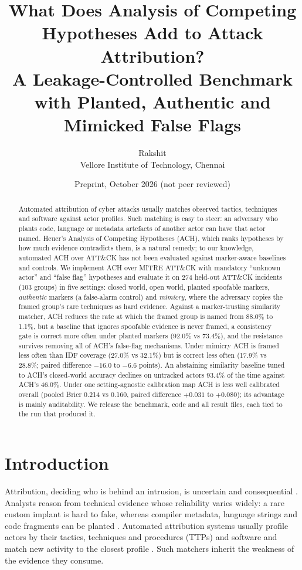 \documentclass[11pt]{article}
\title{What Does Analysis of Competing Hypotheses Add to Attack Attribution?\\
\large A Leakage-Controlled Benchmark with Planted, Authentic and Mimicked False Flags}
\author{Rakshit\\Vellore Institute of Technology, Chennai}
\date{Preprint, October 2026 (not peer reviewed)}
\begin{document}
\maketitle

\begin{abstract}
Automated attribution of cyber attacks usually matches observed tactics,
techniques and software against actor profiles. Such matching is easy to
steer: an adversary who plants code, language or metadata artefacts of
another actor can have that actor named. Heuer's Analysis of Competing
Hypotheses (ACH), which ranks hypotheses by how much evidence contradicts
them, is a natural remedy; to our knowledge, automated ACH over ATT\&CK has
not been evaluated against marker-aware baselines and controls. We implement
ACH over MITRE ATT\&CK with mandatory ``unknown actor'' and ``false flag''
hypotheses and evaluate it on 274 held-out ATT\&CK incidents (103 groups) in
five settings: closed world, open world, planted spoofable markers,
\emph{authentic} markers (a false-alarm control) and \emph{mimicry}, where the
adversary copies the framed group's rare techniques as hard evidence. Against
a marker-trusting similarity matcher, ACH reduces the rate at which the framed
group is named from 88.0\% to 1.1\%, but a baseline that ignores spoofable
evidence is never framed, a consistency gate is correct more often under
planted markers (92.0\% vs 73.4\%), and the resistance survives removing all
of ACH's false-flag mechanisms. Under mimicry ACH is framed less often than
IDF coverage (27.0\% vs 32.1\%) but is correct less often (17.9\% vs 28.8\%;
paired difference $-16.0$ to $-6.6$ points). An abstaining similarity baseline
tuned to ACH's closed-world accuracy declines on untracked actors 93.4\% of the
time against ACH's 46.0\%. Under one setting-agnostic calibration map ACH is
less well calibrated overall (pooled Brier 0.214 vs 0.160, paired difference
$+0.031$ to $+0.080$); its advantage is mainly auditability. We release the
benchmark, code and all result files, each tied to the run that produced it.
\end{abstract}

\section{Introduction}
Attribution, deciding who is behind an intrusion, is uncertain and
consequential \citep{rid2015}. Analysts reason from technical evidence whose
reliability varies widely: a rare custom implant is hard to fake, whereas
compiler metadata, language strings and code fragments can be planted
\citep{skopik2020}. Automated attribution systems usually profile actors by
their tactics, techniques and procedures (TTPs) and software and match new
activity to the closest profile \citep{noor2019}. Such matchers inherit the
weakness of the evidence they consume.
\end{document}
